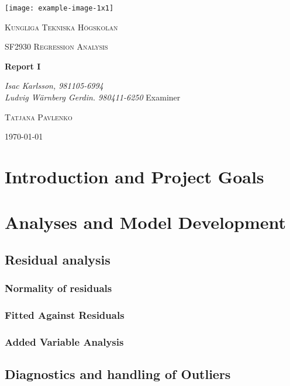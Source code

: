 \documentclass[11pt]{article}
\author{Ludde}
\date{\today}
\title{}
\begin{document}
\begin{titlepage}
\centering
\texttt{[image: example-image-1x1]}\par\vspace{1cm}
{\scshape\LARGE Kungliga Tekniska Högskolan \par}
\vspace{1cm}
{\scshape\Large SF2930 Regression Analysis \par}
\vspace{1.5cm}
{\huge\bfseries Report I \\  \par}
\vspace{2cm}
{\Large\itshape Isac Karlsson, 981105-6994\\ Ludvig Wärnberg Gerdin. 980411-6250}
\vfill
Examiner \par
\textsc{Tatjana Pavlenko}

\vfill

{\large \today\par}
\end{titlepage}

\newpage
\tableofcontents
\newpage

\section{Introduction and Project Goals}
\label{sec:org5160126}
\section{Analyses and Model Development}
\label{sec:org921761c}
\subsection{Residual analysis}
\label{sec:org2be2e8e}
\subsubsection{Normality of residuals}
\label{sec:orgf40786e}
\subsubsection{Fitted Against Residuals}
\label{sec:orgea96e8a}
\subsubsection{Added Variable Analysis}
\label{sec:org419f97e}
\subsection{Diagnostics and handling of Outliers}
\label{sec:orgca77c7b}
\end{document}
